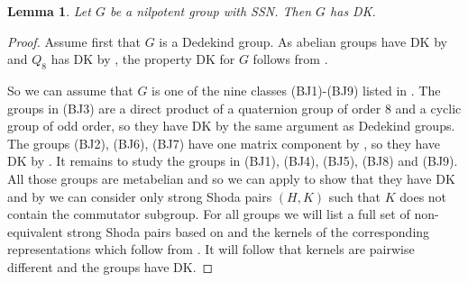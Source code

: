 \documentclass[a4paper,10pt]{amsart}
\newtheorem{lemma}{Lemma}[section]
\theoremstyle{definition}
\theoremstyle{remark}
\begin{document}
\begin{lemma}\label{lem:DKForNilpotentSSN}
Let $G$ be a nilpotent group with SSN. Then $G$ has DK.
\end{lemma}
\begin{proof}
Assume first that $G$ is a Dedekind group. As abelian groups have DK by  and $Q_8$ has DK by , the property DK for $G$ follows from .

So we can assume that $G$ is one of the nine classes (BJ1)-(BJ9) listed in \cite[Theorem 4.1]{JespersSun}. The groups in (BJ3) are a direct product of a quaternion group of order $8$ and a cyclic group of odd order, so they have DK by the same argument as Dedekind groups. The groups (BJ2), (BJ6), (BJ7) have one matrix component by \cite[Lemma 4.5 \& page 11]{JespersSun}, so they have DK by . It remains to study the groups in (BJ1), (BJ4), (BJ5), (BJ8) and (BJ9). All those groups are metabelian and so we can apply  to show that they have DK and by  we can consider only strong Shoda pairs $(H,K)$ such that $K$ does not contain the commutator subgroup. For all groups we will list a full set of non-equivalent strong Shoda pairs based on  and the kernels of the corresponding representations which follow from . It will follow that kernels are pairwise different and the groups have DK.


\end{proof}
\end{document}
